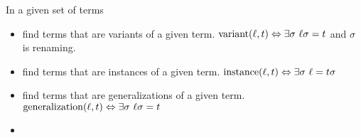 
\begin{definition}
In a given set of terms
\begin{itemize}
\item find terms that are variants of a given term.
$\VRNT(\ell,t) \Leftrightarrow \exists\sigma\ \ell\sigma = t$ and $\sigma$ is renaming.
\item find terms that are  instances of a given term.
$\operatorname{instance}(\ell,t) \Leftrightarrow \exists\sigma\ \ell = t\sigma$
\item find terms that are  generalizations of a given term.
$\GNRL(\ell,t) \Leftrightarrow \exists\sigma\ \ell\sigma = t$
\item {}
\end{itemize}
\end{definition}